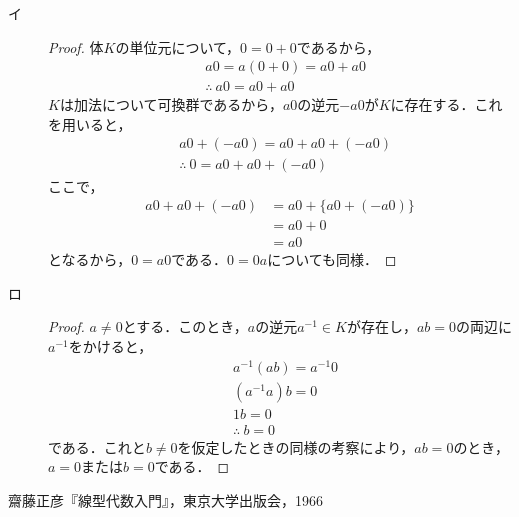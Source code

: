 \documentclass[uplatex,dvipdfmx,a4paper,10pt,fleqn]{jsarticle}
\begin{document}
\begin{tleftbar}
\begin{description}
    \item[イ] 
	\begin{proof}
		体$K$の単位元について，$0=0+0$であるから，
		\begin{align*}
			&a 0=a(0+0)=a0 + a0\\
			&\therefore ~ a0 = a0 + a0
		\end{align*}
		$K$は加法について可換群であるから，$a0$の逆元$-a0$が$K$に存在する．これを用いると，
\begin{align*}
	&a0 + (-a0) = a0 + a0 + (-a0) \\
	&\therefore ~ 0 = a0 + a0 +(-a0)
\end{align*}
 ここで，
 \begin{align*}
	a0 + a0 +(-a0)&=a0+ \{a0+(-a0)\} \\
	& = a0 + 0 \\
	& = a0
 \end{align*}
となるから，$0=a0$である．$0=0a$についても同様．
\end{proof}
\item[ロ]
\begin{proof}
        $a \ne 0$とする．このとき，$a$の逆元$a^{-1} \in K$が存在し，$ab=0$の両辺に$a^{-1}$をかけると，
        \begin{align*}
            &a^{-1} (ab) = a^{-1} 0 \\
            &(a^{-1}a)b =0 \\
            &1b =0 \\
            &\therefore~ b=0
        \end{align*}
        である．これと$b \ne 0$を仮定したときの同様の考察により，$ab=0$のとき，$a=0$または$b=0$である．
    \end{proof}
    \end{description}
\end{tleftbar}

\begin{thebibliography}{9}
	 齋藤正彦『線型代数入門』，東京大学出版会，1966
\end{thebibliography}
\end{document}
